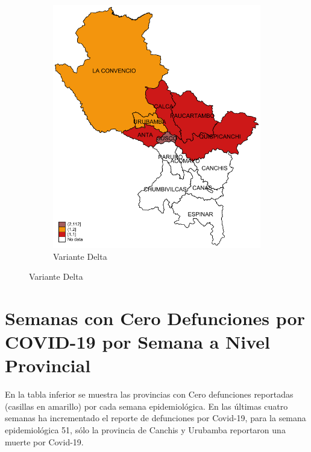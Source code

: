 \documentclass[12pt,a4paper,openany]{book}
\begin{document}
\begin{figure}[h]
				\vspace{10mm}
				\begin{subfigure}[b]{0.40\textwidth}
					\centering
					\includegraphics[width=\textwidth]{../figuras/variantes_provincial_delta.pdf}
					\caption{Variante Delta}
				\end{subfigure}
			\end{figure}

\clearpage


\clearpage
	\section*{Semanas con Cero Defunciones por COVID-19 por Semana a Nivel Provincial}
	
	\noindent En la tabla inferior se muestra las provincias con Cero defunciones reportadas (casillas en amarillo) por cada semana epidemiológica. En las últimas cuatro semanas ha incrementado el reporte de defunciones por Covid-19, para la semana epidemiológica 51, sólo la provincia de Canchis y Urubamba reportaron una muerte por Covid-19.  
	
\end{document}
